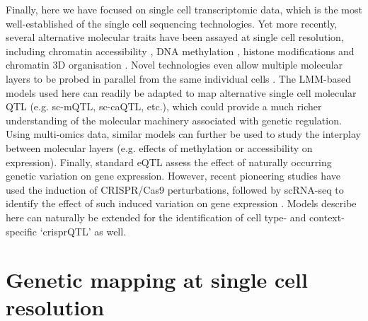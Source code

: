 Finally, here we have focused on single cell transcriptomic data, which is the most well-established of the single cell sequencing technologies.
Yet more recently, several alternative molecular traits have been assayed at single cell resolution, including chromatin accessibility  \cite{buenrostro2018integrated, corces2016lineage},
DNA methylation  \cite{guo2013single, smallwood2014single, farlik2015single},
histone modifications \cite{rotem2015single}
and chromatin 3D organisation \cite{nagano2013single}.
Novel technologies even allow multiple molecular layers to be probed in parallel from the same individual cells \cite{stoeckius2017simultaneous, cao2018joint, clark2018scnmt}.
The LMM-based models used here can readily be adapted to map alternative single cell molecular QTL (e.g. sc-mQTL, sc-caQTL, etc.), which could provide a much richer understanding of the molecular machinery associated with genetic regulation.
Using multi-omics data, similar models can further be used to study the interplay between molecular layers (e.g. effects of methylation or accessibility on expression).
Finally, standard eQTL assess the effect of naturally occurring genetic variation on gene expression.
However, recent pioneering studies have used the induction of CRISPR/Cas9 perturbations, followed by scRNA-seq to identify the effect of such induced variation on gene expression \cite{gasperini2019genome}.
Models describe here can naturally be extended for the identification of cell type- and context-specific `crisprQTL' as well.

\section{Genetic mapping at single cell resolution}

